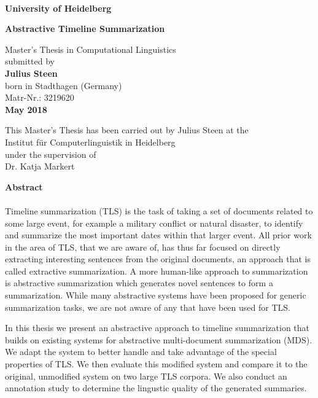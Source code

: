 \documentclass[a4paper,BCOR=10mm]{report}
\numberwithin{lemma}{chapter}
\numberwithin{definition}{chapter}
\begin{document}
\begin{titlepage}
\begin{center}
 
\Large\textbf{\\
University of Heidelberg}
\vspace{2cm}

\Huge\textbf{
Abstractive Timeline Summarization
}

\vspace{10cm}

\normalsize
Master's Thesis in Computational Linguistics\\
submitted by\\
\vspace{0.5cm}
\Large\textbf{Julius Steen}\\
\normalsize
\vspace{0.5cm}
born in Stadthagen (Germany)\\
\normalsize
Matr-Nr.: 3219620 \\
\vspace{0.5cm}
\Large\textbf{May 2018} \\
\normalsize

\newpage

\normalsize
This Master's Thesis has been carried out by Julius Steen at the\\
Institut für Computerlinguistik in Heidelberg\\
under the supervision of\\
Dr. Katja Markert
\vfill
\end{center}

\newpage
\noindent
\large\textbf{Abstract}\\
\\

Timeline summarization (TLS) is the task of taking a set of documents related to some large event, for example a military conflict or natural disaster, to identify and summarize the most important dates within that larger event.
All prior work in the area of TLS, that we are aware of, has thus far focused on directly extracting interesting sentences from the original documents, an approach that is called extractive summarization. A more human-like approach to summarization is abstractive summarization which generates novel sentences to form a summarization. While many abstractive systems have been proposed for generic summarization tasks, we are not aware of any that have been used for TLS.

In this thesis we present an abstractive approach to timeline summarization that builds on existing systems for abstractive multi-document summarization (MDS). We adapt the system to better handle and take advantage of the special properties of TLS. We then evaluate this modified system and compare it to the original, unmodified system on two large TLS corpora.
We also conduct an annotation study to determine the lingustic quality of the generated summaries.


\end{titlepage}
\end{document}
